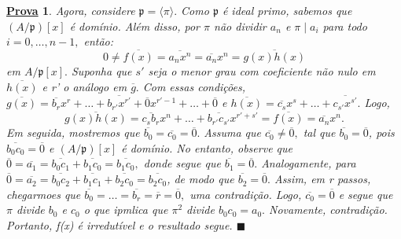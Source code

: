 \documentclass{article}
\newtheorem*{proof*}{\underline{Prova}}
\renewcommand\qedsymbol{$\blacksquare$}
\begin{document}
\begin{proof*}
      Agora, considere \(\mathfrak{p} = \langle \pi  \rangle.\) Como \(\mathfrak{p}\) é ideal primo, sabemos que 
      \((A/\mathfrak{p})[x]\) é domínio. Além disso, por \(\pi \) não dividir \(a_{n}\) e \(\pi \mid a_{i}\) para todo \(i=0, \dotsc , n-1,\) então:
      \[
        0\neq \overline{f(x)} = \overline{a_{n}x^{n}} = \overline{a_{n}}x^{n} = \overline{g(x)h(x)}
      \]
      em \(A/\mathfrak{p}[x].\) Suponha que \(s'\) seja o menor grau com coeficiente não nulo em \(\overline{h(x)}\) e r' o análogo em \(\overline{g}.\) 
      Com essas condições, \(\overline{g(x)} = \overline{b_{r}}x^{r} + \dotsc + \overline{b_{r'}x^{r'}} + \overline{0}x^{r'-1} + \dotsc + \overline{0}\) e
      \(\overline{h(x)} = \overline{c_{s}}x^{s} + \dotsc + \overline{c_{s'}x^{s'}}.\) Logo, 
      \[
        \overline{g(x)h(x)} = \overline{c_{s}b_{r}}x^{n} + \dotsc + \overline{b_{r'}c_{s'}}x^{r'+s'} = \overline{f(x)} = \overline{a_{n}}x^{n}.
      \]
      Em seguida, mostremos que \(\overline{b_{0}} = \overline{c_{0}} = \overline{0}.\) Assuma que \(\overline{c_{0}}\neq \overline{0},\) tal que \(\overline{b_{0}}=\overline{0}\), pois
      \(\overline{b_{0}c_{0}} = \overline{0}\) e \((A/\mathfrak{p})[x]\) é domínio. No entanto, observe que \(\overline{0} = \overline{a_{1}} = \overline{b_{0}c_{1}} + \overline{b_{1}c_{0}} = \overline{b_{1}c_{0}},\)
      donde segue que \(\overline{b_{1}} = \overline{0}.\) Analogamente, para \(\overline{0} = \overline{a_{2}} = \overline{b_{0}c_{2}}+\overline{b_{1}c_{1}}+\overline{b_{2}c_{0}} = \overline{b_{2}c_{0}}\),
      de modo que \(\overline{b_{2}} = \overline{0}.\) Assim, em r passos, chegarmoes que \(\overline{b_{0}} = \dotsc = \overline{b_{r}} = \overline{r} = \overline{0},\) uma contradição.
      Logo, \(\overline{c_{0}} = \overline{0}\) e segue que \(\pi \) divide \(b_{0}\) e \(c_{0}\) o que ipmlica que \(\pi^{2}\) divide \(b_{0}c_{0} = a_{0}.\) Novamente, 
      contradição. Portanto, f(x) é irredutível e o resultado segue. \qedsymbol
    \end{proof*}
    \newpage

    
\end{document}

